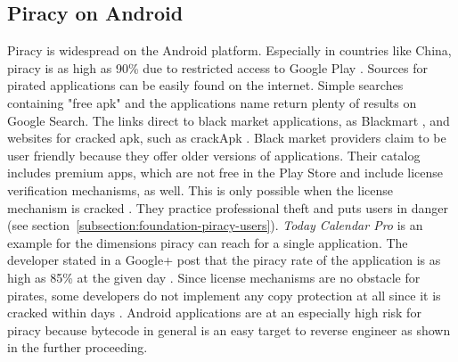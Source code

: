 \subsection{Piracy on Android} \label{subsection:foundation-piracy-android}
Piracy is widespread on the Android platform. Especially in countries like China, piracy is as high as 90\% due to restricted access to Google Play \cite{piracyRate}.
Sources for pirated applications can be easily found on the internet.
Simple searches containing "free apk" and the applications name return plenty of results on Google Search.
The links direct to black market applications, as Blackmart \cite{blackmartStore}, and websites for cracked \gls{apk}, such as crackApk \cite{crackApk}.
Black market providers claim to be user friendly because they offer older versions of applications.
Their catalog includes premium apps, which are not free in the Play Store and include license verification mechanisms, as well.
This is only possible when the license mechanism is cracked \cite{apksfree}.
They practice professional theft and puts users in danger (see section~\ref{subsection:foundation-piracy-users}).
\newline
\textit{Today Calendar Pro} is an example for the dimensions piracy can reach for a single application.
The developer stated in a Google+ post that the piracy rate of the application is as high as 85\% at the given day \cite{xdaPiracy} \cite{developersPiracy}.
\newline
Since license mechanisms are no obstacle for pirates, some developers do not implement any copy protection at all since it is cracked within days \cite{recodeMonument}.
Android applications are at an especially high risk for piracy because bytecode in general is an easy target to reverse engineer as shown in the further proceeding.
